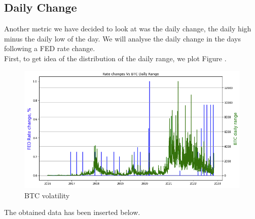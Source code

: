 \documentclass[12pt]{article}
\begin{document}
\subsection{Daily Change}
Another metric we have decided to look at was the daily change, the daily high minus the daily low of the day. We will analyse the daily change in the days following a FED rate change.\\
First, to get idea of the distribution of the daily range, we plot Figure \cite{fig:range}.
\begin{figure}[H]
   \includegraphics[width = \textwidth]{research_project/text/paper/range.png}
   \centering
   \caption{BTC volatility}
   \label{fig:range}
\end{figure}
The obtained data has been inserted below.
\end{document}
